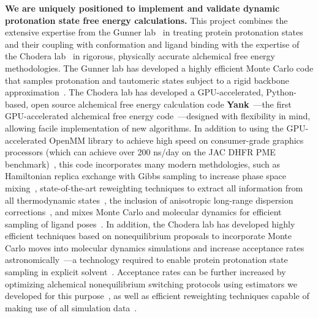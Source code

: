 \documentclass[11pt]{article}
\begin{document}
{\bf We are uniquely positioned to implement and validate dynamic protonation state free energy calculations.}
This project combines the extensive expertise from the Gunner lab~\cite{gunner:biophys-j:1997:mcce,gunner:bba:2000:proton-electron-transfer,gunner:biophys-j:2002:mcce,gunner:j-comput-chem:2009:mcce2,gunner:jmb:2009:mcce2-hsa,gunner:proteins:2010:reaction-center} in treating protein protonation states and their coupling with conformation and ligand binding with the expertise of the Chodera lab~\cite{mobley-chodera-dill:2006:jcp:orientation-restraints,mobley-chodera-dill:2007:jctc:confine-and-release,shirts-mobley-chodera-pande:2007:jpcb:dispersion-corrections,chodera:jcp:2007,shirts-mobley-chodera:2007:annu-rep-comput-chem:prime-time,shirts-chodera:jcp:2008:mbar,ncmc,chodera-shirts:jcp:2011:gibbs,chodera:curr-opin-struct-biol:2011:drug-discovery,chodera-shirts:jcamd:2013:yank} in rigorous, physically accurate alchemical free energy methodologies.
The Gunner lab has developed a highly efficient Monte Carlo code that samples protonation and tautomeric states subject to a rigid backbone approximation~\cite{gunner:biophys-j:1997:mcce,gunner:bba:2000:proton-electron-transfer,gunner:biophys-j:2002:mcce,gunner:j-comput-chem:2009:mcce2,gunner:jmb:2009:mcce2-hsa,gunner:proteins:2010:reaction-center}.
The Chodera lab has developed a GPU-accelerated, Python-based, open source alchemical free energy calculation code {\bf {\sc Yank}}~\cite{yank-url}---the first GPU-accelerated alchemical free energy code~\cite{chodera-shirts:jcamd:2013:yank}---designed with flexibility in mind, allowing facile implementation of new algorithms.
In addition to using the GPU-accelerated OpenMM library to achieve high speed on consumer-grade graphics processors (which can achieve over 200 ns/day on the JAC DHFR PME benchmark)~\cite{eastman:jctc:2012:openmm,openmm-url}, this code incorporates many modern methdologies, such as Hamiltonian replica exchange with Gibbs sampling to increase phase space mixing~\cite{chodera-shirts:jcp:2011:gibbs}, state-of-the-art reweighting techniques to extract all information from all thermodynamic states~\cite{shirts-chodera:jcp:2008:mbar}, the inclusion of anisotropic long-range dispersion corrections~\cite{shirts-mobley-chodera-pande:2007:jpcb:dispersion-corrections}, and mixes Monte Carlo and molecular dynamics for efficient sampling of ligand poses~\cite{chodera-shirts:jcamd:2013:yank}.
In addition, the Chodera lab has developed highly efficient techniques based on nonequilibrium proposals to incorporate Monte Carlo moves into molecular dynamics simulations and increase acceptance rates astronomically~\cite{ncmc}---a technology required to enable protein protonation state sampling in explicit solvent~\cite{roux:jctc:2015:constant-pH-ncmc}.
Acceptance rates can be further increased by optimizing alchemical nonequilibrium switching protocols using estimators we developed for this purpose~\cite{minh-chodera:2011:jcp:mis-estimator}, as well as efficient reweighting techniques capable of making use of all simulation data~\cite{shirts-chodera:jcp:2008:mbar,minh-chodera:2009:jcp:minh-chodera}.
\end{document}
